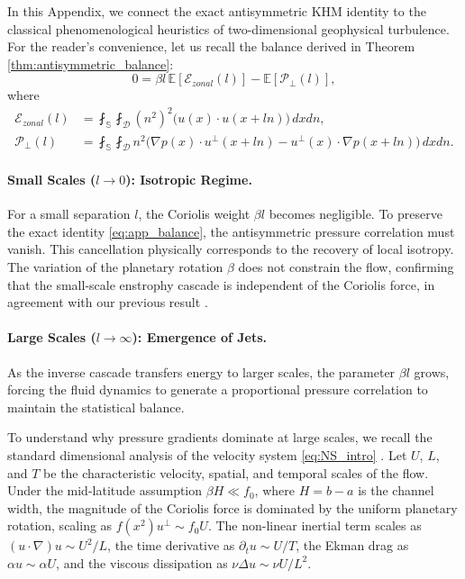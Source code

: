 \documentclass[11pt,a4paper]{article}
\numberwithin{equation}{section}
\numberwithin{theorem}{section}
\numberwithin{remark}{section}
\numberwithin{definition}{section}
\begin{document}
In this Appendix, we connect the exact antisymmetric KHM identity to the classical phenomenological heuristics of two-dimensional geophysical turbulence. For the reader's convenience, let us recall the balance derived in Theorem \ref{thm:antisymmetric_balance}:
\begin{equation}\label{eq:app_balance}
    0 = \beta l \, \mathbb{E}[\mathcal{E}_{zonal}(l)] - \mathbb{E}[\mathcal{P}_{\perp}(l)],
\end{equation}
where
\begin{align}
    \mathcal{E}_{zonal} (l)&= \fint_{\mathbb{S}}\fint_{\mathcal{D}} (n^2)^2 \big( u(x) \cdot u(x+ln) \big) \, dxdn, \label{eq:zonal_energy} \\
    \mathcal{P}_{\perp}(l) &= \fint_{\mathbb{S}}\fint_{\mathcal{D}} n^2 \big( \nabla p(x) \cdot u^\perp(x+ln) - u^\perp(x) \cdot \nabla p(x+ln) \big) \, dxdn.
\end{align}

\paragraph{Small Scales ($l \to 0$): Isotropic Regime.} 
For a small separation $l$, the Coriolis weight $\beta l$ becomes negligible. To preserve the exact identity \eqref{eq:app_balance}, the antisymmetric pressure correlation must vanish. This cancellation physically corresponds to the recovery of local isotropy. The variation of the planetary rotation $\beta$ does not constrain the flow, confirming that the small-scale enstrophy cascade is independent of the Coriolis force, in agreement with our previous result \cite{YuriAmiraliGigliola}.

\paragraph{Large Scales ($l \to \infty$): Emergence of Jets.}
As the inverse cascade transfers energy to larger scales, the parameter $\beta l$ grows, forcing the fluid dynamics to generate a proportional pressure correlation to maintain the statistical balance.

To understand why pressure gradients dominate at large scales, we recall the standard dimensional analysis of the velocity system \eqref{eq:NS_intro} \cite{vallis1}. Let $U$, $L$, and $T$ be the characteristic velocity, spatial, and temporal scales of the flow. Under the mid-latitude assumption $\beta H \ll f_0$, where $H=b-a$ is the channel width, the magnitude of the Coriolis force is dominated by the uniform planetary rotation, scaling as $f(x^2) u^\perp \sim f_0 U$. The non-linear inertial term scales as $(u \cdot \nabla)u \sim U^2/L$, the time derivative as $\partial_t u \sim U/T$, the Ekman drag as $\alpha u \sim \alpha U$, and the viscous dissipation as $\nu \Delta u \sim \nu U/L^2$.  
\end{document}
